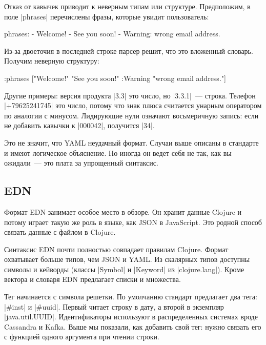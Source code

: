 Отказ от кавычек приводит к неверным типам или структуре. Предположим, в
поле \spverb|phrases| перечислены фразы, которые увидит пользователь:

\begin{english}
  \begin{yaml}
phrases:
  - Welcome!
  - See you soon!
  - Warning: wrong email address.
  \end{yaml}
\end{english}

Из-за двоеточия в последней строке парсер решит, что это вложенный
словарь. Получим неверную структуру:

\begin{english}
  \begin{clojure}
{:phrases
 ["Welcome!"
  "See you soon!"
  {:Warning "wrong email address."}]}
  \end{clojure}
\end{english}

Другие примеры: версия продукта \spverb|3.3| это число, но \spverb|3.3.1|~---
строка. Телефон \spverb|+79625241745| это число, потому что знак плюса считается
унарным оператором по аналогии с минусом. Лидирующие нули означают восьмеричную
запись: если не добавить кавычки к \spverb|000042|, получится \spverb|34|.

Это не значит, что YAML неудачный формат. Случаи выше описаны в стандарте и
имеют логическое объяснение. Но иногда он ведет себя не так, как вы ожидали~---
это плата за упрощенный синтаксис.

\subsection{EDN}


Формат EDN занимает особое место в обзоре. Он хранит данные Clojure и потому
играет такую же роль в языке, как JSON в JavaScript. Это родной способ связать
данные с файлом в Clojure.

Синтаксис EDN почти полностью совпадает правилам Clojure. Формат охватывает
больше типов, чем JSON и YAML. Из скалярных типов доступны символы и
кейворды (классы \spverb|Symbol| и \spverb|Keyword| из
\spverb|clojure.lang|). Кроме вектора и словаря EDN предлагает списки и
множества.


Тег начинается с символа решетки. По умолчанию стандарт предлагает два тега:
\spverb|#inst| и \spverb|#uuid|. Первый читает строку в дату, а второй в
экземпляр \spverb|java.util.UUID|. Идентификаторы используют в распределенных
системах вроде Cassandra и Kafka. Выше мы показали, как добавить свой тег: нужно
связать его с функцией одного аргумента при чтении строки.

